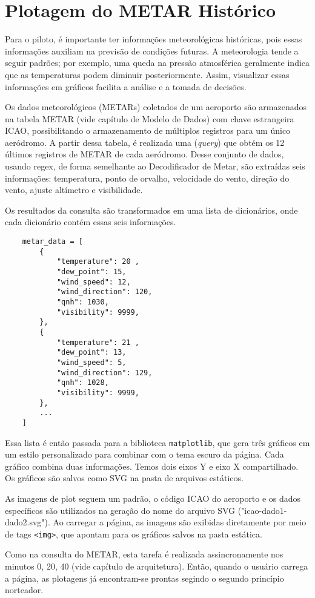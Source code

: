 \chapter{Plotagem do METAR Histórico}

Para o piloto, é importante ter informações meteorológicas históricas, pois 
essas informações auxiliam na previsão de condições futuras. A meteorologia tende 
a seguir padrões; por exemplo, uma queda na pressão atmosférica geralmente indica 
que as temperaturas podem diminuir posteriormente. Assim, visualizar essas 
informações em gráficos facilita a análise e a tomada de decisões.

Os dados meteorológicos (METARs) coletados de um aeroporto são armazenados na tabela
METAR (vide capítulo de Modelo de Dados) com chave estrangeira ICAO, possibilitando
o armazenamento de múltiplos registros para um único aeródromo. A partir dessa 
tabela, é realizada uma (\textit{query}) que obtém os 12 últimos registros 
de METAR de cada aeródromo. Desse conjunto de dados, usando regex, de forma
semelhante ao Decodificador de Metar, são extraídas seis informações: 
temperatura, ponto de orvalho, velocidade do vento, direção do vento, ajuste altímetro e visibilidade.

Os resultados da consulta são transformados em uma lista de dicionários, onde 
cada dicionário contém essas seis informações.

\begin{verbatim}
    metar_data = [
        {
            "temperature": 20 ,
            "dew_point": 15,
            "wind_speed": 12,
            "wind_direction": 120,
            "qnh": 1030,
            "visibility": 9999,
        },
        {
            "temperature": 21 ,
            "dew_point": 13,
            "wind_speed": 5,
            "wind_direction": 129,
            "qnh": 1028,
            "visibility": 9999,
        },
        ...
    ]
\end{verbatim}


Essa lista é então passada para a biblioteca \texttt{matplotlib}, que gera três 
gráficos em um estilo personalizado para combinar com o tema escuro da página. 
Cada gráfico combina duas informações. Temos dois eixos Y e eixo X compartilhado.
Os gráficos são salvos como SVG na pasta de arquivos estáticos.

As imagens de plot seguem um padrão, o código ICAO do aeroporto e os dados 
específicos são utilizados na geração do nome do arquivo SVG ("icao-dado1-dado2.svg"). 
Ao carregar a página, as imagens são exibidas diretamente por meio de tags \texttt{<img>},
 que apontam para os gráficos salvos na pasta estática.

Como na consulta do METAR, esta tarefa é realizada assincronamente nos 
minutos 0, 20, 40 (vide capítulo de arquitetura). Então, quando o usuário carrega a 
página, as plotagens já encontram-se prontas segindo o segundo princípio norteador.
